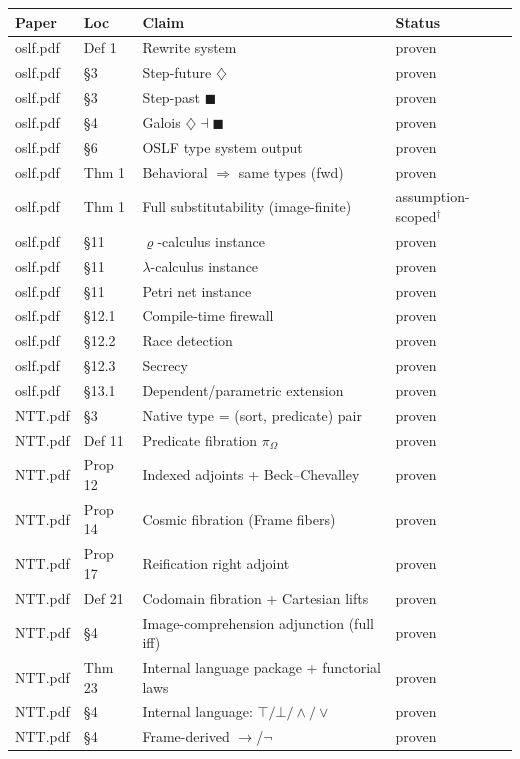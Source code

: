 \documentclass[]{article}
\newcommand{\Dia}{\ensuremath{\diamondsuit}}
\newcommand{\Bx}{\ensuremath{\blacksquare}}
\begin{document}
\begin{longtable}{llll}
\textbf{Paper} & \textbf{Loc} & \textbf{Claim} & \textbf{Status} \\
\hline
\endhead
oslf.pdf & Def 1 & Rewrite system & proven \\
oslf.pdf & \S 3 & Step-future $\Dia$ & proven \\
oslf.pdf & \S 3 & Step-past $\Bx$ & proven \\
oslf.pdf & \S 4 & Galois $\Dia \dashv \Bx$ & proven \\
oslf.pdf & \S 6 & OSLF type system output & proven \\
oslf.pdf & Thm 1 & Behavioral $\Rightarrow$ same types (fwd) & proven \\
oslf.pdf & Thm 1 & Full substitutability (image-finite) & assumption-scoped$^\dagger$ \\
oslf.pdf & \S 11 & $\varrho$-calculus instance & proven \\
oslf.pdf & \S 11 & $\lambda$-calculus instance & proven \\
oslf.pdf & \S 11 & Petri net instance & proven \\
oslf.pdf & \S 12.1 & Compile-time firewall & proven \\
oslf.pdf & \S 12.2 & Race detection & proven \\
oslf.pdf & \S 12.3 & Secrecy & proven \\
oslf.pdf & \S 13.1 & Dependent/parametric extension & proven \\
\hline
NTT.pdf & \S 3 & Native type = (sort, predicate) pair & proven \\
NTT.pdf & Def 11 & Predicate fibration $\pi_\Omega$ & proven \\
NTT.pdf & Prop 12 & Indexed adjoints + Beck--Chevalley & proven \\
NTT.pdf & Prop 14 & Cosmic fibration (Frame fibers) & proven \\
NTT.pdf & Prop 17 & Reification right adjoint & proven \\
NTT.pdf & Def 21 & Codomain fibration + Cartesian lifts & proven \\
NTT.pdf & \S 4 & Image-comprehension adjunction (full iff) & proven \\
NTT.pdf & Thm 23 & Internal language package + functorial laws & proven \\
NTT.pdf & \S 4 & Internal language: $\top/\bot/\land/\lor$ & proven \\
NTT.pdf & \S 4 & Frame-derived $\to$/$\lnot$ & proven \\

\end{longtable}
\end{document}
